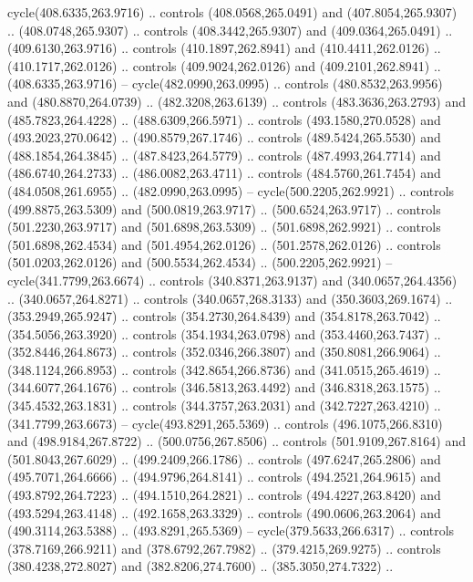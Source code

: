 \begin{scope}[cm={{1.25,0.0,0.0,-1.25,(0.0,743.43331)}}]
    cycle(408.6335,263.9716) .. controls (408.0568,265.0491) and
    (407.8054,265.9307) .. (408.0748,265.9307) .. controls (408.3442,265.9307) and
    (409.0364,265.0491) .. (409.6130,263.9716) .. controls (410.1897,262.8941) and
    (410.4411,262.0126) .. (410.1717,262.0126) .. controls (409.9024,262.0126) and
    (409.2101,262.8941) .. (408.6335,263.9716) -- cycle(482.0990,263.0995) ..
    controls (480.8532,263.9956) and (480.8870,264.0739) .. (482.3208,263.6139) ..
    controls (483.3636,263.2793) and (485.7823,264.4228) .. (488.6309,266.5971) ..
    controls (493.1580,270.0528) and (493.2023,270.0642) .. (490.8579,267.1746) ..
    controls (489.5424,265.5530) and (488.1854,264.3845) .. (487.8423,264.5779) ..
    controls (487.4993,264.7714) and (486.6740,264.2733) .. (486.0082,263.4711) ..
    controls (484.5760,261.7454) and (484.0508,261.6955) .. (482.0990,263.0995) --
    cycle(500.2205,262.9921) .. controls (499.8875,263.5309) and
    (500.0819,263.9717) .. (500.6524,263.9717) .. controls (501.2230,263.9717) and
    (501.6898,263.5309) .. (501.6898,262.9921) .. controls (501.6898,262.4534) and
    (501.4954,262.0126) .. (501.2578,262.0126) .. controls (501.0203,262.0126) and
    (500.5534,262.4534) .. (500.2205,262.9921) -- cycle(341.7799,263.6674) ..
    controls (340.8371,263.9137) and (340.0657,264.4356) .. (340.0657,264.8271) ..
    controls (340.0657,268.3133) and (350.3603,269.1674) .. (353.2949,265.9247) ..
    controls (354.2730,264.8439) and (354.8178,263.7042) .. (354.5056,263.3920) ..
    controls (354.1934,263.0798) and (353.4460,263.7437) .. (352.8446,264.8673) ..
    controls (352.0346,266.3807) and (350.8081,266.9064) .. (348.1124,266.8953) ..
    controls (342.8654,266.8736) and (341.0515,265.4619) .. (344.6077,264.1676) ..
    controls (346.5813,263.4492) and (346.8318,263.1575) .. (345.4532,263.1831) ..
    controls (344.3757,263.2031) and (342.7227,263.4210) .. (341.7799,263.6673) --
    cycle(493.8291,265.5369) .. controls (496.1075,266.8310) and
    (498.9184,267.8722) .. (500.0756,267.8506) .. controls (501.9109,267.8164) and
    (501.8043,267.6029) .. (499.2409,266.1786) .. controls (497.6247,265.2806) and
    (495.7071,264.6666) .. (494.9796,264.8141) .. controls (494.2521,264.9615) and
    (493.8792,264.7223) .. (494.1510,264.2821) .. controls (494.4227,263.8420) and
    (493.5294,263.4148) .. (492.1658,263.3329) .. controls (490.0606,263.2064) and
    (490.3114,263.5388) .. (493.8291,265.5369) -- cycle(379.5633,266.6317) ..
    controls (378.7169,266.9211) and (378.6792,267.7982) .. (379.4215,269.9275) ..
    controls (380.4238,272.8027) and (382.8206,274.7600) .. (385.3050,274.7322) ..

\end{scope}
